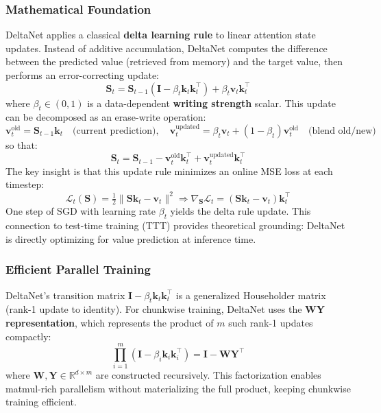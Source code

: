 \documentclass[11pt,a4paper]{article}
\begin{document}
\subsubsection{Mathematical Foundation}

DeltaNet \citep{yang_deltanet_2024} applies a classical \textbf{delta learning rule} to linear attention state updates. Instead of additive accumulation, DeltaNet computes the difference between the predicted value (retrieved from memory) and the target value, then performs an error-correcting update:
\[
\mathbf{S}_t = \mathbf{S}_{t-1}(\mathbf{I} - \beta_t \mathbf{k}_t \mathbf{k}_t^\top) + \beta_t \mathbf{v}_t \mathbf{k}_t^\top
\]
where $\beta_t \in (0,1)$ is a data-dependent \textbf{writing strength} scalar. This update can be decomposed as an erase-write operation:
\[
\mathbf{v}_t^\text{old} = \mathbf{S}_{t-1} \mathbf{k}_t \quad \text{(current prediction)}, \quad
\mathbf{v}_t^\text{updated} = \beta_t \mathbf{v}_t + (1-\beta_t)\mathbf{v}_t^\text{old} \quad \text{(blend old/new)}
\]
so that:
\[
\mathbf{S}_t = \mathbf{S}_{t-1} - \mathbf{v}_t^\text{old}\mathbf{k}_t^\top + \mathbf{v}_t^\text{updated}\mathbf{k}_t^\top
\]
The key insight is that this update rule minimizes an online MSE loss at each timestep:
\[
\mathcal{L}_t(\mathbf{S}) = \tfrac{1}{2}\|\mathbf{S}\mathbf{k}_t - \mathbf{v}_t\|^2 \Rightarrow \nabla_{\mathbf{S}} \mathcal{L}_t = (\mathbf{S}\mathbf{k}_t - \mathbf{v}_t)\mathbf{k}_t^\top
\]
One step of SGD with learning rate $\beta_t$ yields the delta rule update. This connection to test-time training (TTT) provides theoretical grounding: DeltaNet is directly optimizing for value prediction at inference time.

\subsubsection{Efficient Parallel Training}

DeltaNet's transition matrix $\mathbf{I} - \beta_t \mathbf{k}_t \mathbf{k}_t^\top$ is a generalized Householder matrix (rank-1 update to identity). For chunkwise training, DeltaNet uses the \textbf{WY representation}, which represents the product of $m$ such rank-1 updates compactly:
\[
\prod_{i=1}^{m} (\mathbf{I} - \beta_i \mathbf{k}_i \mathbf{k}_i^\top) = \mathbf{I} - \mathbf{W}\mathbf{Y}^\top
\]
where $\mathbf{W}, \mathbf{Y} \in \mathbb{R}^{d \times m}$ are constructed recursively. This factorization enables matmul-rich parallelism without materializing the full product, keeping chunkwise training efficient.
\end{document}
